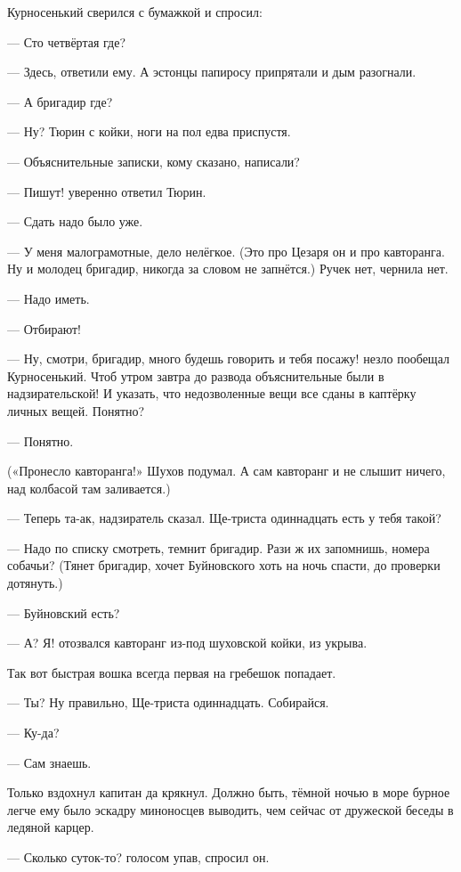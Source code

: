 Курносенький сверился с бумажкой и спросил:

--- Сто четвёртая где?

--- Здесь, \dash ответили ему. А эстонцы папиросу припрятали и дым разогнали.

--- А бригадир где?

--- Ну? \dash Тюрин с койки, ноги на пол едва приспустя.

--- Объяснительные записки, кому сказано, написали?

--- Пишут! \dash уверенно ответил Тюрин.

--- Сдать надо было уже.

--- У меня \dash малограмотные, дело нелёгкое. \dash (Это про Цезаря он и про кавторанга. Ну и молодец
бригадир, никогда за словом не запнётся.) \Dash Ручек нет, чернила нет.

--- Надо иметь.

--- Отбирают!

--- Ну, смотри, бригадир, много будешь говорить \dash и тебя посажу! \dash незло пообещал
Курносенький. \Dash Чтоб утром завтра до развода объяснительные были в надзирательской! И
указать, что недозволенные вещи все сданы в каптёрку личных вещей. Понятно?

--- Понятно.

(«Пронесло кавторанга!» \dash Шухов подумал. А сам кавторанг и не слышит ничего, над колбасой там
заливается.)

--- Теперь та-ак, \dash надзиратель сказал. \Dash Ще-триста одиннадцать \dash есть у тебя такой?

--- Надо по списку смотреть, \dash темнит бригадир. \Dash Рази ж их запомнишь, номера собачьи? \dash (Тянет
бригадир, хочет Буйновского хоть на ночь спасти, до проверки дотянуть.)

--- Буйновский \dash есть?

--- А? Я! \dash отозвался кавторанг из-под шуховской койки, из укрыва.

Так вот быстрая вошка всегда первая на гребешок попадает.

--- Ты? Ну правильно, Ще-триста одиннадцать. Собирайся.

--- Ку-да?

--- Сам знаешь.

Только вздохнул капитан да крякнул. Должно быть, тёмной ночью в море бурное легче ему было
эскадру миноносцев выводить, чем сейчас от дружеской беседы в ледяной карцер.

--- Сколько суток-то? \dash голосом упав, спросил он.

